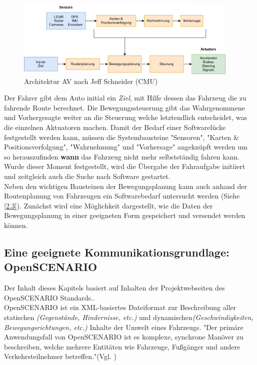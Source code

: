 \begin{figure}[H]
	\centering
	\includegraphics[width=0.95\textwidth]{../pictures/arichtecture_AV.png}
	\caption{Architektur AV nach Jeff Schneider (CMU) \cite{jschneider}}
\end{figure}
Der Fahrer gibt dem Auto initial ein \textit{Ziel}, mit Hilfe dessen das Fahrzeug die zu fahrende Route berechnet. Die Bewegungssteuerung gibt das Wahrgenommene und Vorhergesagte weiter an die Steuerung welche letztendlich entscheidet, was die einzelnen Aktuatoren machen.
Damit der Bedarf einer Softwarelücke festgestellt werden kann, müssen die Systembausteine "Sensoren", "Karten \& Positionsverfolgung", "Wahrnehmung" und "Vorhersage" angeknüpft werden um so herauszufinden \textbf{wann} das Fahrzeug nicht mehr selbstständig fahren kann. Wurde dieser Moment festgestellt, wird die Übergabe der Fahraufgabe initiiert und zeitgleich auch die Suche nach Software gestartet.\\
Neben den wichtigen Bausteinen der Bewegungsplanung kann auch anhand der Routenplanung von Fahrzeugen ein Softwarebedarf untersucht werden (Siehe \ref{2.3}). Zunächst wird eine Möglichkeit dargestellt, wie die Daten der Bewegungsplanung in einer geeigneten Form gespeichert und versendet werden können.
\subsection{Eine geeignete Kommunikationsgrundlage: OpenSCENARIO}\label{2.2}
Der Inhalt dieses Kapitels basiert auf Inhalten der Projektwebseiten des OpenSCENARIO Standards.\cite{b35}.\\
OpenSCENARIO ist ein XML-basiertes Dateiformat zur Beschreibung aller statischen \textit{(Gegenstände, Hindernisse, etc.)} und dynamischen\textit{(Geschwindigkeiten, Bewegungsrichtungen, etc.)} Inhalte der Umwelt eines Fahrzeugs. "Der primäre Anwendungsfall von OpenSCENARIO ist es komplexe, synchrone Manöver zu beschreiben, welche mehrere Entitäten wie Fahrzeuge, Fußgänger und andere Verkehrsteilnehmer betreffen."(Vgl. \cite[asam.net]{b35})\\

